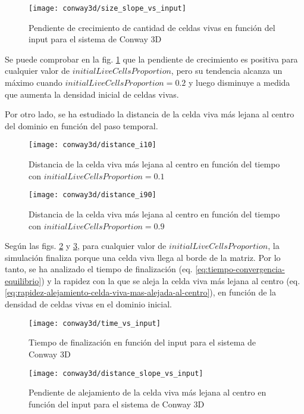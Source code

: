 \begin{figure}[H]
    \centering
    \texttt{[image: conway3d/size\_slope\_vs\_input]}
    \caption{Pendiente de crecimiento de cantidad de celdas vivas en función del input para el sistema de Conway 3D}
    \label{fig:conway3d_size_slope_vs_input}
\end{figure}

Se puede comprobar en la fig. \ref{fig:conway3d_size_slope_vs_input} que la pendiente de crecimiento es positiva
para cualquier valor de $initialLiveCellsProportion$, pero su tendencia alcanza un máximo cuando
$initialLiveCellsProportion = 0.2$ y luego disminuye a medida que aumenta la densidad inicial de celdas vivas.

Por otro lado, se ha estudiado la distancia de la celda viva más lejana al centro del dominio en función del
paso temporal.

\begin{figure}[H]
    \centering
    \texttt{[image: conway3d/distance\_i10]}
    \caption{Distancia de la celda viva más lejana al centro en función del tiempo con $initialLiveCellsProportion = 0.1$}
    \label{fig:conway3d_d10}
\end{figure}
\begin{figure}[H]
    \centering
    \texttt{[image: conway3d/distance\_i90]}
    \caption{Distancia de la celda viva más lejana al centro en función del tiempo con $initialLiveCellsProportion = 0.9$}
    \label{fig:conway3d_d90}
\end{figure}

Según las figs. \ref{fig:conway3d_d10} y \ref{fig:conway3d_d90}, para cualquier valor de $initialLiveCellsProportion$,
la simulación finaliza porque una celda viva llega al borde de la matriz.
Por lo tanto, se ha analizado el tiempo de finalización (eq. \ref{eq:tiempo-convergencia-equilibrio}) y la
rapidez con la que se aleja la celda viva más lejana al centro
(eq. \ref{eq:rapidez-alejamiento-celda-viva-mas-alejada-al-centro}), en función de la densidad de celdas vivas
en el dominio inicial.

\begin{figure}[H]
    \centering
    \texttt{[image: conway3d/time\_vs\_input]}
    \caption{Tiempo de finalización en función del input para el sistema de Conway 3D}
    \label{fig:conway3d_time_vs_input}
\end{figure}
\begin{figure}[H]
    \centering
    \texttt{[image: conway3d/distance\_slope\_vs\_input]}
    \caption{Pendiente de alejamiento de la celda viva más lejana al centro en función del input para el sistema de Conway 3D}
    \label{fig:conway3d_distance_slope_vs_input}
\end{figure}

